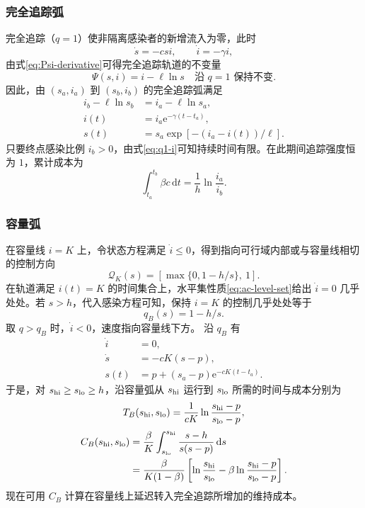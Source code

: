 \documentclass[lang=cn,a4paper,newtx]{elegantpaper}
\theoremstyle{plain}
\theoremstyle{definition}
\newcommand{\dd}{\,\mathrm d}
\newcommand{\e}{\mathrm e}
\begin{document}
\subsubsection{完全追踪弧}
完全追踪（$q=1$）使非隔离感染者的新增流入为零，此时
\begin{equation}
\dot s=-csi,\qquad \dot i=-\gamma i,
\label{eq:q1-system}
\end{equation}
由式\eqref{eq:Psi-derivative}可得完全追踪轨道的不变量
\begin{equation}
\boxed{\Psi(s,i)=i-\ell\ln s\quad\text{沿 }q=1\text{ 保持不变}.}
\label{eq:Psi}
\end{equation}
因此，由 $(s_a,i_a)$ 到 $(s_b,i_b)$ 的完全追踪弧满足
\begin{align}
i_b-\ell\ln s_b&=i_a-\ell\ln s_a,
\label{eq:q1-characteristic}\\
i(t)&=i_a\e^{-\gamma(t-t_a)},
\label{eq:q1-i}\\
s(t)&=s_a\exp[-(i_a-i(t))/\ell].
\label{eq:q1-s}
\end{align}
只要终点感染比例 $i_b>0$，由式\eqref{eq:q1-i}可知持续时间有限。在此期间追踪强度恒为 $1$，累计成本为
\begin{equation}
\int_{t_a}^{t_b}\beta c\dd t=\frac1h\ln\frac{i_a}{i_b}.
\label{eq:q1-cost}
\end{equation}

\subsubsection{容量弧}
\label{sec:boundary-arc}
在容量线 $i=K$ 上，令状态方程满足 $\dot i\le0$，得到指向可行域内部或与容量线相切的控制方向
\begin{equation}
\mathcal Q_K(s)=\left[\max\{0,1-h/s\},\ 1\right].
\label{eq:boundary-feasible}
\end{equation}
在轨道满足 $i(t)=K$ 的时间集合上，水平集性质\eqref{eq:ac-level-set}给出 $\dot i=0$ 几乎处处。若 $s>h$，代入感染方程可知，保持 $i=K$ 的控制几乎处处等于
\begin{equation}
\boxed{q_B(s)=1-h/s.}
\label{eq:qB}
\end{equation}
取 $q>q_B$ 时，$\dot i<0$，速度指向容量线下方。
沿 $q_B$ 有
\begin{align}
\dot i&=0,\label{eq:boundary-i}\\
\dot s&=-cK(s-p),\label{eq:boundary-s}\\
s(t)&=p+(s_a-p)\e^{-cK(t-t_a)}.\label{eq:boundary-s-explicit}
\end{align}
于是，对 $s_{\rm hi}\ge s_{\rm lo}\ge h$，沿容量弧从 $s_{\rm hi}$ 运行到 $s_{\rm lo}$ 所需的时间与成本分别为
\begin{equation}
T_B(s_{\rm hi},s_{\rm lo})=\frac1{cK}\ln\frac{s_{\rm hi}-p}{s_{\rm lo}-p},
\label{eq:boundary-duration}
\end{equation}
\begin{align}
C_B(s_{\rm hi},s_{\rm lo})
&=\frac \beta K\int_{s_{\rm lo}}^{s_{\rm hi}}\frac{s-h}{s(s-p)}\dd s\notag\\
&=\frac{\beta}{K(1-\beta)}\left[\ln\frac{s_{\rm hi}}{s_{\rm lo}}
-\beta\ln\frac{s_{\rm hi}-p}{s_{\rm lo}-p}\right].
\label{eq:boundary-cost}
\end{align}
现在可用 $C_B$ 计算在容量线上延迟转入完全追踪所增加的维持成本。
\end{document}

